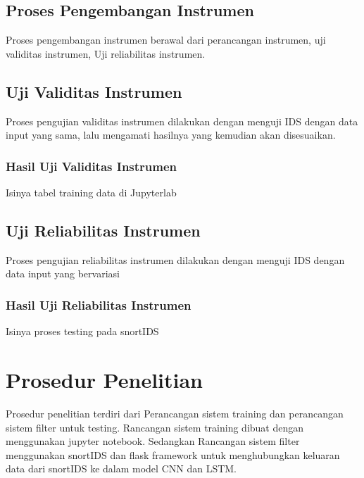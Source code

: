 \documentclass[./skripsi.tex]{subfiles}
\begin{document}
\subsection{Proses Pengembangan Instrumen}
\par Proses pengembangan instrumen berawal dari perancangan instrumen, uji validitas instrumen, Uji reliabilitas instrumen.
\subsection{Uji Validitas Instrumen}
\par Proses pengujian validitas instrumen dilakukan dengan menguji IDS dengan data input yang sama, lalu mengamati hasilnya yang kemudian akan disesuaikan.
\subsubsection{Hasil Uji Validitas Instrumen}
\par Isinya tabel training data di Jupyterlab
\subsection{Uji Reliabilitas Instrumen}
\par Proses pengujian reliabilitas instrumen dilakukan dengan menguji IDS dengan data input yang bervariasi
\subsubsection{Hasil Uji Reliabilitas Instrumen}
\par Isinya proses testing pada snortIDS
\section{Prosedur Penelitian}
\par Prosedur penelitian terdiri dari Perancangan sistem training dan perancangan sistem filter untuk testing. Rancangan sistem training dibuat dengan menggunakan jupyter notebook. Sedangkan Rancangan sistem filter menggunakan snortIDS dan flask framework untuk menghubungkan keluaran data dari snortIDS ke dalam model CNN dan LSTM.
\end{document}
